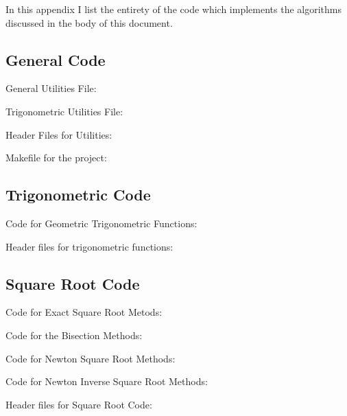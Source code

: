 \renewcommand{\thelstlisting}{}
\renewcommand{\lstlistingname}{File}

In this appendix I list the entirety of the code which implements the algorithms discussed in the body of this document.

\subsection{General Code}
General Utilities File:


Trigonometric Utilities File:


Header Files for Utilities:



Makefile for the project:


\subsection{Trigonometric Code}
Code for Geometric Trigonometric Functions:


Header files for trigonometric functions:


\subsection{Square Root Code}
Code for Exact Square Root Metods:


Code for the Bisection Methods:


Code for Newton Square Root Methods:


Code for Newton Inverse Square Root Methods:


Header files for Square Root Code:




